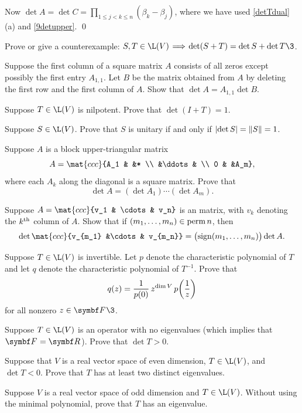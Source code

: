 \smallskip
\noindent
Now $\displaystyle \det A = \det C = \prod_{1 \le j < k \le n} (\beta_k - \beta_j)$, where we have used \ref{detTdual}(a) and \ref{9detupper}.
\qed

\begin{exercises}

\exercise
Prove or give a counterexample: $S, T \in \L(V) \!\implies\! \det (S+T) = \det S + \det T\3$.


\exercise
Suppose the first column of a square matrix $A$ consists of all zeros except possibly the first entry $A_{1,1}$. Let $B$ be the matrix obtained from $A$ by deleting the first row and the first column of $A$. Show that $\det A = A_{1,1} \det B$.


\exercise
Suppose $T \in \L(V)$ is nilpotent. Prove that $\det(I + T) = 1$.


\exercise
Suppose $S \in \L(V)$. Prove that $S$ is unitary if and only if $\lvert\det S\rvert = \lVert S\rVert = 1$.


\exercise
Suppose $A$ is a block upper-triangular matrix \label{blockdet}
\[
A = \mat{ccc}{A_1 & &* \\ &\ddots & \\ 0 & &A_m},
\]
where each $A_k$ along the diagonal is a square matrix.  Prove that
\[
\det A = (\det A_1) \dotsm (\det A_m).
\]
\exercisedisplayend


\exercise
Suppose $A = \mat{ccc}{v_1 & \cdots & v_n}$ is an  matrix, with $v_k$ denoting the $k^{\text{{th}}}$ column of $A$. Show that if
$(m_1, \ldots, m_n) \in \operatorname{perm} n$, then
\[
\det \mat{ccc}{v_{m_1} &\cdots & v_{m_n}} = \paren[\big]{\sign(m_1, \ldots, m_n)} \det A.
\]
\exercisedisplayend


\exercise
Suppose $T \in \L(V)$ is invertible. Let $p$ denote the characteristic polynomial of $T$ and let $q$ denote the characteristic polynomial of $T^{-1}$. Prove that
\[
q(z) = \frac{1}{p(0)}\, z^{\dim V} \, p\paren[\bigg]{\frac{1}{z}}
\]
for all nonzero $z \in \F{}\3$.


\exercise
Suppose $T \in \L(V)$ is an operator with no eigenvalues (which implies that $\F{} = \R{}$). Prove that $\det T > 0$.


\exercise
Suppose that $V$ is a real vector space of even dimension, $T \in \L(V)$, and $\det T < 0$. Prove that $T$ has at least two distinct eigenvalues.


\exercise
Suppose $V$ is a real vector space of odd dimension and $T \in \L(V)$. Without using the minimal polynomial, prove that $T$ has an eigenvalue.\label{9oddeigen}



\end{exercises}
